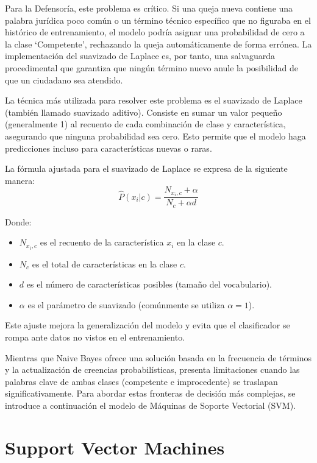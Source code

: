 Para la Defensoría, este problema es crítico. Si una queja nueva contiene una palabra jurídica poco común o un término técnico específico que no figuraba en el histórico de entrenamiento, el modelo podría asignar una probabilidad de cero a la clase ‘Competente’, rechazando la queja automáticamente de forma errónea. La implementación del suavizado de Laplace es, por tanto, una salvaguarda procedimental que garantiza que ningún término nuevo anule la posibilidad de que un ciudadano sea atendido.

La técnica más utilizada para resolver este problema es el suavizado de Laplace (también llamado suavizado aditivo).  Consiste en sumar un valor pequeño (generalmente 1) al recuento de cada combinación de clase y característica, asegurando que ninguna probabilidad sea cero. Esto permite que el modelo haga predicciones incluso para características nuevas o raras.

La fórmula ajustada para el suavizado de Laplace se expresa de la siguiente manera:
\begin{equation}
\hat{P}(x_i | c) = \frac{N_{x_i,c} + \alpha}{N_c + \alpha d}
\end{equation}

Donde:
\begin{itemize}
\item $N_{x_i,c}$ es el recuento de la característica $x_i$ en la clase $c$.
\item $N_c$ es el total de características en la clase $c$.
\item $d$ es el número de características posibles (tamaño del vocabulario).
\item $\alpha$ es el parámetro de suavizado (comúnmente se utiliza $\alpha = 1$).
\end{itemize}

Este ajuste mejora la generalización del modelo y evita que el clasificador se rompa ante datos no vistos en el entrenamiento.

Mientras que Naive Bayes ofrece una solución basada en la frecuencia de términos y la actualización de creencias probabilísticas, presenta limitaciones cuando las palabras clave de ambas clases (competente e improcedente) se traslapan significativamente. Para abordar estas fronteras de decisión más complejas, se introduce a continuación el modelo de Máquinas de Soporte Vectorial (SVM).

\section{Support Vector Machines}


